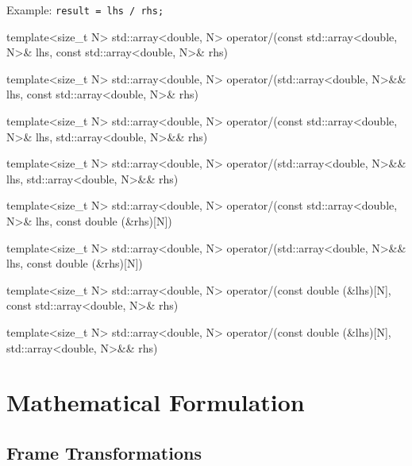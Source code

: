 \documentclass[11pt,fleqn]{report}
\begin{document}
Example: \texttt{result = lhs / rhs;}  
\begin{code}
template<size_t N>
std::array<double, N> operator/(const std::array<double, N>& lhs, 
                                const std::array<double, N>& rhs)

template<size_t N>
std::array<double, N> operator/(std::array<double, N>&& lhs, 
                                const std::array<double, N>& rhs)

template<size_t N>
std::array<double, N> operator/(const std::array<double, N>& lhs, 
                                std::array<double, N>&& rhs)

template<size_t N>
std::array<double, N> operator/(std::array<double, N>&& lhs, 
                                std::array<double, N>&& rhs)

template<size_t N>
std::array<double, N> operator/(const std::array<double, N>& lhs, 
                                const double (&rhs)[N])

template<size_t N>
std::array<double, N> operator/(std::array<double, N>&& lhs, 
                                const double (&rhs)[N])

template<size_t N>
std::array<double, N> operator/(const double (&lhs)[N], 
                                const std::array<double, N>& rhs)

template<size_t N>
std::array<double, N> operator/(const double (&lhs)[N], 
                                std::array<double, N>&& rhs)
\end{code}

\section{Mathematical Formulation}

\subsection{Frame Transformations}
\end{document}
